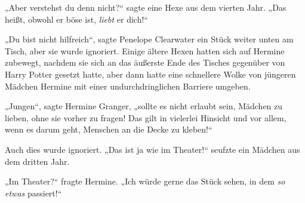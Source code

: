 „Aber verstehst du denn nicht?“ sagte eine Hexe aus dem vierten Jahr.
„Das heißt, obwohl er böse ist, \emph{liebt} er dich!“

„Du bist nicht hilfreich“, sagte Penelope Clearwater ein Stück weiter unten am Tisch, aber sie wurde ignoriert. Einige ältere Hexen hatten sich auf Hermine zubewegt, nachdem sie sich an das äußerste Ende des Tisches gegenüber von Harry Potter gesetzt hatte, aber dann hatte eine schnellere Wolke von jüngeren Mädchen Hermine mit einer undurchdringlichen Barriere umgeben.

„Jungen“, sagte Hermine Granger, „sollte es nicht erlaubt sein, Mädchen zu lieben, ohne sie vorher zu fragen! Das gilt in vielerlei Hinsicht und vor allem, wenn es darum geht, Menschen an die Decke zu kleben!“

Auch dies wurde ignoriert.
„Das ist ja wie im Theater!“ seufzte ein Mädchen aus dem dritten Jahr.

„Im Theater?“ fragte Hermine.
„Ich würde gerne das Stück sehen, in dem \emph{so etwas} passiert!“

